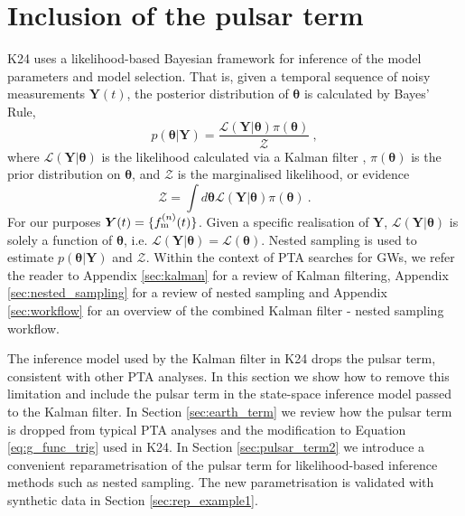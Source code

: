 \documentclass[fleqn,usenatbib,useAMS]{mnras}
\begin{document}
\section{Inclusion of the pulsar term}\label{sec:pulsar_term}
K24 uses a likelihood-based Bayesian framework for inference of the model parameters and model selection. That is, given a temporal sequence of noisy measurements $\boldsymbol{Y}(t)$, the posterior distribution of $\boldsymbol{\theta}$ is calculated by Bayes' Rule,
\begin{equation}
	p(\boldsymbol{\theta} | \boldsymbol{Y}) = \frac{\mathcal{L}(\boldsymbol{Y} | \boldsymbol{\theta}) \pi(\boldsymbol{\theta})}{\mathcal{Z}} \ ,
\end{equation}
where $\mathcal{L}(\boldsymbol{Y}| \boldsymbol{\theta})$ is the likelihood calculated via a Kalman filter \citep{Kalman1}, $\pi(\boldsymbol{\theta})$ is the prior distribution on $\boldsymbol{\theta}$, and $\mathcal{Z}$ is the marginalised likelihood, or evidence
\begin{equation}
	\mathcal{Z} = \int d \boldsymbol{\theta} \mathcal{L}(\boldsymbol{Y} | \boldsymbol{\theta})  \pi(\boldsymbol{\theta})  \ . \label{eq:model_evidence}
\end{equation}
For our purposes ${\boldsymbol{Y}}(t) = \{ f_{\rm m}^{(n)}(t) \}$. Given a specific realisation of $\boldsymbol{Y}$, $\mathcal{L}(\boldsymbol{Y}| \boldsymbol{\theta})$ is solely a function of $\boldsymbol{\theta}$, i.e. $\mathcal{L}(\boldsymbol{Y}| \boldsymbol{\theta}) = \mathcal{L}(\boldsymbol{\theta})$. Nested sampling \citep{Skilling} is used to estimate $p(\boldsymbol{\theta} | \boldsymbol{Y})$ and $\mathcal{Z}$. Within the context of PTA searches for GWs, we refer the reader to Appendix  \ref{sec:kalman} for a review of Kalman filtering, Appendix \ref{sec:nested_sampling} for a review of nested sampling and Appendix \ref{sec:workflow} for an overview of the combined Kalman filter - nested sampling workflow. \newline 

The inference model used by the Kalman filter in K24 drops the pulsar term, consistent with other PTA analyses. In this section we show how to remove this limitation and include the pulsar term in the state-space inference model passed to the Kalman filter. In Section \ref{sec:earth_term} we review how the pulsar term is dropped from typical PTA analyses and the modification to Equation \eqref{eq:g_func_trig} used in K24. In Section \ref{sec:pulsar_term2} we introduce a convenient reparametrisation of the pulsar term for likelihood-based inference methods such as nested sampling. The new parametrisation is validated with synthetic data in Section \ref{sec:rep_example1}.
\end{document}
